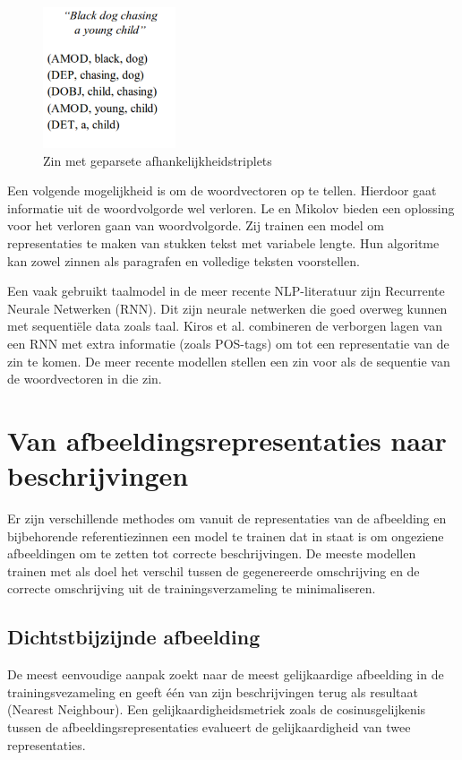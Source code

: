  \begin{figure}[tb]
     \centering
     \includegraphics[width=0.35\textwidth]{Images/dep_relations}
     \caption{Zin met geparsete afhankelijkheidstriplets\cite{Karpathy2014}}
     \label{fig:deprelations}
 \end{figure}

 Een volgende mogelijkheid is om de woordvectoren op te tellen\cite{Lebret2013}. Hierdoor gaat informatie uit de woordvolgorde wel verloren. Le en Mikolov\cite{Le2014a} bieden een oplossing voor het verloren gaan van woordvolgorde. Zij trainen een model om representaties te maken van stukken tekst met variabele lengte. Hun algoritme kan zowel zinnen als paragrafen en volledige teksten voorstellen.

 Een vaak gebruikt taalmodel in de meer recente NLP-literatuur zijn Recurrente Neurale Netwerken (RNN)\cite{Mikolov2010}. Dit zijn neurale netwerken die goed overweg kunnen met sequenti\"ele data zoals taal. Kiros et al.\cite{Kiros2013} combineren de verborgen lagen van een RNN met extra informatie (zoals POS-tags) om tot een representatie van de zin te komen. De meer recente modellen stellen een zin voor als de sequentie van de woordvectoren in die zin.
 
\section{Van afbeeldingsrepresentaties naar beschrijvingen}
Er zijn verschillende methodes om vanuit de representaties van de afbeelding en bijbehorende referentiezinnen een model te trainen dat in staat is om ongeziene afbeeldingen om te zetten tot correcte beschrijvingen. 
De meeste modellen trainen met als doel het verschil tussen de gegenereerde omschrijving en de correcte omschrijving uit de trainingsverzameling te minimaliseren.

\subsection{Dichtstbijzijnde afbeelding}
De meest eenvoudige aanpak zoekt naar de meest gelijkaardige afbeelding in de trainingsvezameling en geeft \'e\'en van zijn beschrijvingen terug als resultaat (Nearest Neighbour)\cite{Devlin2015a}. Een gelijkaardigheidsmetriek zoals de cosinusgelijkenis tussen de afbeeldingsrepresentaties evalueert de gelijkaardigheid van twee representaties.

